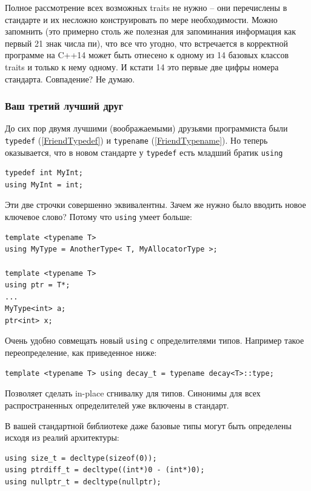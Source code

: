 \documentclass[a4paper,12pt,oneside]{article}
\begin{document}
Полное рассмотрение всех возможных traits не нужно -- они перечислены в стандарте и их несложно конструировать по мере необходимости. Можно запомнить (это примерно столь же полезная для запоминания информация как первый 21 знак числа пи), что все что угодно, что встречается в корректной программе на C++14 может быть отнесено к одному из 14 базовых классов traits и только к нему одному. И кстати 14 это первые две цифры номера стандарта. Совпадение? Не думаю.

\subsubsection{Ваш третий лучший друг}\label{FriendUsing}

До сих пор двумя лучшими (воображаемыми) друзьями программиста были \lstinline!typedef! (\ref{FriendTypedef}) и \lstinline!typename! (\ref{FriendTypename}). Но теперь оказывается, что в новом стандарте у \lstinline!typedef! есть младший братик \lstinline!using!

\begin{lstlisting}
typedef int MyInt;
using MyInt = int;
\end{lstlisting}

Эти две строчки совершенно эквивалентны. Зачем же нужно было вводить новое ключевое слово? Потому что \lstinline!using! умеет больше:

\begin{lstlisting}
template <typename T> 
using MyType = AnotherType< T, MyAllocatorType >; 

template <typename T> 
using ptr = T*;
...
MyType<int> a;
ptr<int> x;
\end{lstlisting}

Очень удобно совмещать новый \lstinline!using! с определителями типов. Например такое переопределение, как приведенное ниже:

\begin{lstlisting}
template <typename T> using decay_t = typename decay<T>::type;
\end{lstlisting}

Позволяет сделать in-place сгнивалку для типов. Синонимы для всех распространенных определителей уже включены в стандарт.

В вашей стандартной библиотеке даже базовые типы могут быть определены исходя из реалий архитектуры:

\begin{lstlisting}
using size_t = decltype(sizeof(0));
using ptrdiff_t = decltype((int*)0 - (int*)0);
using nullptr_t = decltype(nullptr);
\end{lstlisting}
\end{document}

